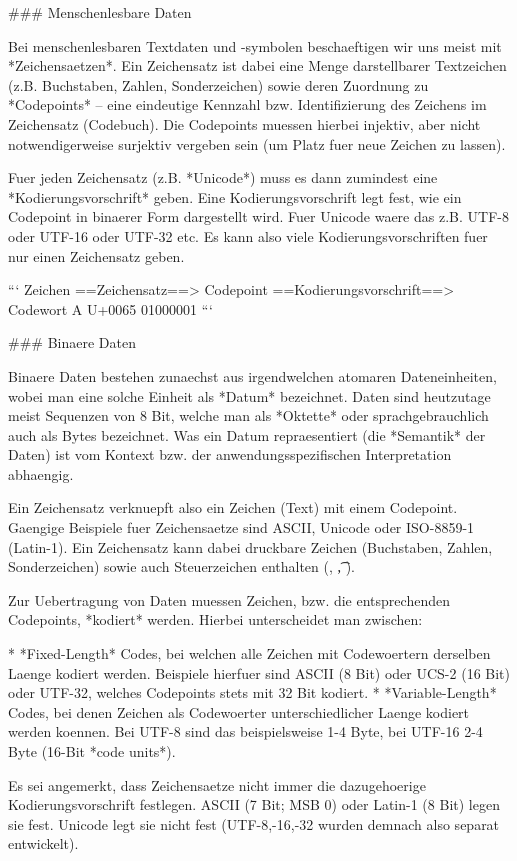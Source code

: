 ### Menschenlesbare Daten

Bei menschenlesbaren Textdaten und -symbolen beschaeftigen wir uns meist mit
*Zeichensaetzen*. Ein Zeichensatz ist dabei eine Menge darstellbarer Textzeichen
(z.B. Buchstaben, Zahlen, Sonderzeichen) sowie deren Zuordnung zu *Codepoints*
-- eine eindeutige Kennzahl bzw. Identifizierung des Zeichens im Zeichensatz
(Codebuch). Die Codepoints muessen hierbei injektiv, aber nicht notwendigerweise
surjektiv vergeben sein (um Platz fuer neue Zeichen zu lassen).

Fuer jeden Zeichensatz (z.B. *Unicode*) muss es dann zumindest eine
*Kodierungsvorschrift* geben. Eine Kodierungsvorschrift legt fest, wie ein
Codepoint in binaerer Form dargestellt wird. Fuer Unicode waere das z.B. UTF-8
oder UTF-16 oder UTF-32 etc. Es kann also viele Kodierungsvorschriften fuer nur
einen Zeichensatz geben.

```
Zeichen ==Zeichensatz==> Codepoint ==Kodierungsvorschrift==> Codewort
   A                      U+0065                             01000001
```

### Binaere Daten

Binaere Daten bestehen zunaechst aus irgendwelchen atomaren Dateneinheiten,
wobei man eine solche Einheit als *Datum* bezeichnet. Daten sind heutzutage
meist Sequenzen von 8 Bit, welche man als *Oktette* oder sprachgebrauchlich auch
als Bytes bezeichnet. Was ein Datum repraesentiert (die *Semantik* der Daten)
ist vom Kontext bzw. der anwendungsspezifischen Interpretation abhaengig.

Ein Zeichensatz verknuepft also ein Zeichen (Text) mit einem Codepoint. Gaengige
Beispiele fuer Zeichensaetze sind ASCII, Unicode oder ISO-8859-1 (Latin-1). Ein
Zeichensatz kann dabei druckbare Zeichen (Buchstaben, Zahlen, Sonderzeichen)
sowie auch Steuerzeichen enthalten (\n, \t, \a).

Zur Uebertragung von Daten muessen Zeichen, bzw. die entsprechenden Codepoints,
*kodiert* werden. Hierbei unterscheidet man zwischen:

* *Fixed-Length* Codes, bei welchen alle Zeichen mit Codewoertern derselben
  Laenge kodiert werden. Beispiele hierfuer sind ASCII (8 Bit) oder UCS-2 (16
  Bit) oder UTF-32, welches Codepoints stets mit 32 Bit kodiert.
* *Variable-Length* Codes, bei denen Zeichen als Codewoerter unterschiedlicher
  Laenge kodiert werden koennen. Bei UTF-8 sind das beispielsweise 1-4 Byte, bei
  UTF-16 2-4 Byte (16-Bit *code units*).

Es sei angemerkt, dass Zeichensaetze nicht immer die dazugehoerige
Kodierungsvorschrift festlegen. ASCII (7 Bit; MSB 0) oder Latin-1 (8 Bit) legen
sie fest. Unicode legt sie nicht fest (UTF-8,-16,-32 wurden demnach also separat
entwickelt).

